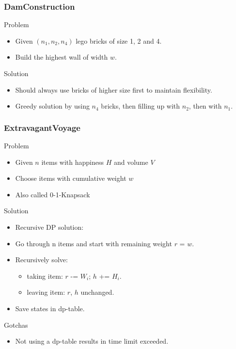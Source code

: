 \documentclass{beamer}
\begin{document}
\begin{frame}
    \frametitle{DamConstruction}
    \begin{block}{Problem}
        \begin{itemize}
            \item Given $(n_1, n_2, n_4)$ lego bricks of size 1, 2 and 4.
            \item Build the highest wall of width $w$.
        \end{itemize}
    \end{block}
    \begin{block}{Solution}
        \begin{itemize}
            \item Should always use bricks of higher size first to maintain flexibility.
            \item Greedy solution by using $n_4$ bricks, then filling up with $n_2$, then with $n_1$.
        \end{itemize}
    \end{block}
\end{frame}

\begin{frame}
    \frametitle{ExtravagantVoyage}
    \begin{block}{Problem}
        \begin{itemize}
            \item Given $n$ items with happiness $H$ and volume $V$
            \item Choose items with cumulative weight $w$
            \item Also called 0-1-Knapsack
        \end{itemize}
    \end{block}
    \begin{block}{Solution}
        \begin{itemize}
            \item Recursive DP solution:
            \item Go through n items and start with remaining weight $r$ = $w$.
            \item Recursively solve:
            \begin{itemize}
            \item taking item: $r$ -= $W_i$; $h$ += $H_i$.
            \item leaving item: $r$, $h$ unchanged.
            \end{itemize}
            \item Save states in dp-table.
        \end{itemize}
    \end{block}
    \begin{block}{Gotchas}
        \begin{itemize}
            \item Not using a dp-table results in time limit exceeded.
        \end{itemize}
    \end{block}
\end{frame}
\end{document}

